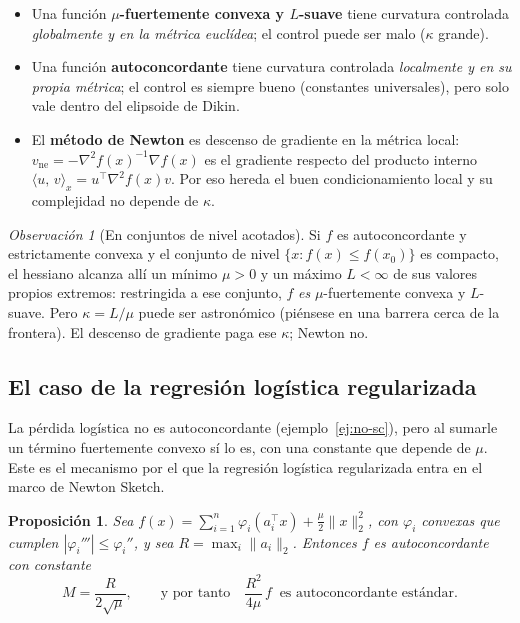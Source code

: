 \documentclass[11pt,a4paper,oneside]{book}
\newtheorem{proposicion}[teorema]{Proposición}
\theoremstyle{definition}
\theoremstyle{remark}
\newtheorem{observacion}[teorema]{Observación}
\newcommand{\T}{^{\top}}
\newcommand{\nrm}[1]{\lVert #1\rVert}
\newcommand{\abs}[1]{\left\lvert #1\right\rvert}
\newcommand{\ip}[2]{\langle #1,\, #2\rangle}
\newcommand{\vne}{v_{\mathrm{ne}}}
\begin{document}
\begin{ideaclave}
\begin{itemize}
  \item Una función \textbf{$\mu$-fuertemente convexa y $L$-suave} tiene curvatura controlada \emph{globalmente
        y en la métrica euclídea}; el control puede ser malo ($\kappa$ grande).
  \item Una función \textbf{autoconcordante} tiene curvatura controlada \emph{localmente y en su propia
        métrica}; el control es siempre bueno (constantes universales), pero solo vale dentro del elipsoide de Dikin.
  \item El \textbf{método de Newton} es descenso de gradiente en la métrica local: $\vne=-\nabla^2 f(x)^{-1}\nabla f(x)$
        es el gradiente respecto del producto interno $\ip{u}{v}_x=u\T\nabla^2 f(x)v$. Por eso hereda el buen
        condicionamiento local y su complejidad no depende de $\kappa$.
\end{itemize}
\end{ideaclave}

\begin{observacion}[En conjuntos de nivel acotados]\label{obs:nivel}
Si $f$ es autoconcordante y estrictamente convexa y el conjunto de nivel $\{x:f(x)\le f(x_0)\}$ es compacto,
el hessiano alcanza allí un mínimo $\mu>0$ y un máximo $L<\infty$ de sus valores propios extremos: restringida a
ese conjunto, $f$ \emph{es} $\mu$-fuertemente convexa y $L$-suave. Pero $\kappa=L/\mu$ puede ser astronómico
(piénsese en una barrera cerca de la frontera). El descenso de gradiente paga ese $\kappa$; Newton no.
\end{observacion}

\subsection{El caso de la regresión logística regularizada}

La pérdida logística no es autoconcordante (ejemplo~\ref{ej:no-sc}), pero al sumarle un término fuertemente
convexo sí lo es, con una constante que depende de $\mu$. Este es el mecanismo por el que la regresión
logística regularizada entra en el marco de Newton Sketch.

\begin{proposicion}\label{prop:logistica-sc}
Sea $f(x)=\sum_{i=1}^n\varphi_i(a_i\T x)+\tfrac\mu2\nrm{x}_2^2$, con $\varphi_i$ convexas que cumplen
$\abs{\varphi_i'''}\le\varphi_i''$, y sea $R=\max_i\nrm{a_i}_2$. Entonces $f$ es autoconcordante con constante
\[ M=\frac{R}{2\sqrt{\mu}},\qquad\text{y por tanto}\quad \frac{R^2}{4\mu}\,f\ \text{ es autoconcordante estándar.} \]
\end{proposicion}
\end{document}
